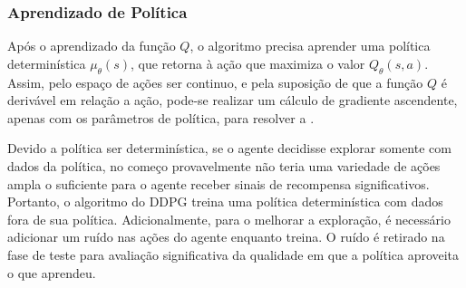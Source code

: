 
\subsubsection{Aprendizado de Política}

Após o aprendizado da função $Q$, o algoritmo precisa aprender uma política determinística $\mu_{\theta}(s)$, que retorna à ação que maximiza o valor $Q_{\theta}(s,a)$. Assim, pelo espaço de ações ser continuo, e pela suposição de que a função $Q$ é derivável em relação a ação, pode-se realizar um cálculo de gradiente ascendente, apenas com os parâmetros de política, para resolver a .


Devido a política ser determinística, se o agente decidisse explorar somente com dados da política, no começo provavelmente não teria uma variedade de ações ampla o suficiente para o agente receber sinais de recompensa significativos. Portanto, o algoritmo do \acrshort{DDPG} treina uma política determinística com dados fora de sua política. Adicionalmente, para o melhorar a exploração, é necessário adicionar um ruído nas ações do agente enquanto treina. O ruído é retirado na fase de teste para avaliação significativa da qualidade em que a política aproveita o que aprendeu.